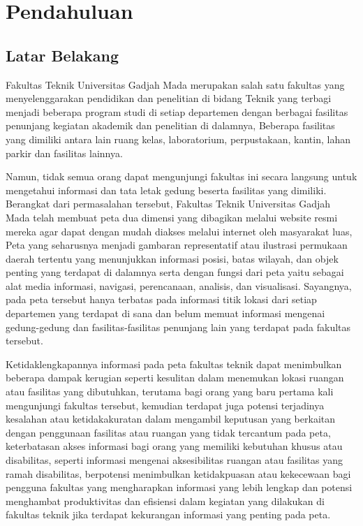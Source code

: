 \chapter{Pendahuluan}

\section{Latar Belakang}

Fakultas Teknik Universitas Gadjah Mada merupakan salah satu fakultas yang menyelenggarakan pendidikan dan penelitian di bidang Teknik yang terbagi menjadi beberapa program studi di setiap departemen dengan berbagai fasilitas penunjang kegiatan akademik dan penelitian di dalamnya, Beberapa fasilitas yang dimiliki antara lain ruang kelas, laboratorium, perpustakaan, kantin, lahan parkir dan fasilitas lainnya.

Namun, tidak semua orang dapat mengunjungi fakultas ini secara langsung untuk mengetahui informasi dan tata letak gedung beserta fasilitas yang dimiliki. Berangkat dari permasalahan tersebut, Fakultas Teknik Universitas Gadjah Mada telah membuat peta dua dimensi yang dibagikan melalui website resmi mereka agar dapat dengan mudah diakses melalui internet oleh masyarakat luas, Peta yang seharusnya menjadi gambaran representatif atau ilustrasi permukaan daerah tertentu yang menunjukkan informasi posisi, batas wilayah, dan objek penting yang terdapat di dalamnya serta dengan fungsi dari peta yaitu sebagai alat media informasi, navigasi, perencanaan, analisis, dan visualisasi. Sayangnya, pada peta tersebut hanya terbatas pada informasi titik lokasi dari setiap departemen yang terdapat di sana dan belum memuat informasi mengenai gedung-gedung dan fasilitas-fasilitas penunjang lain yang terdapat pada fakultas tersebut.

Ketidaklengkapannya informasi pada peta fakultas teknik dapat menimbulkan beberapa dampak kerugian seperti kesulitan dalam menemukan lokasi ruangan atau fasilitas yang dibutuhkan, terutama bagi orang yang baru pertama kali mengunjungi fakultas tersebut, kemudian terdapat juga potensi terjadinya kesalahan atau ketidakakuratan dalam mengambil keputusan yang berkaitan dengan penggunaan fasilitas atau ruangan yang tidak tercantum pada peta, keterbatasan akses informasi bagi orang yang memiliki kebutuhan khusus atau disabilitas, seperti informasi mengenai aksesibilitas ruangan atau fasilitas yang ramah disabilitas, berpotensi menimbulkan ketidakpuasan atau kekecewaan bagi pengguna fakultas yang mengharapkan informasi yang lebih lengkap dan potensi menghambat produktivitas dan efisiensi dalam kegiatan yang dilakukan di fakultas teknik jika terdapat kekurangan informasi yang penting pada peta.

